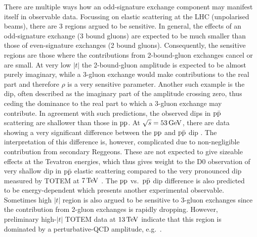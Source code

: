 There are multiple ways how an odd-signature exchange component may manifest itself in observable data. Focussing on elastic scattering at the LHC (unpolarised beams), there are 3 regions argued to be sensitive. In general, the effects of an odd-signature exchange (3 bound gluons) are expected to be much smaller than those of even-signature exchanges (2 bound gluons). Consequently, the sensitive regions are those where the contributions from 2-bound-gluon exchanges cancel or are small. At very low $|t|$ the 2-bound-gluon amplitude is expected to be almost purely imaginary, while a 3-gluon exchange would make contributions to the real part and therefore $\rho$ is a very sensitive parameter. Another such example is the dip, often described as the imaginary part of the amplitude crossing zero, thus ceding the dominance to the real part to which a 3-gluon exchange may contribute. In agreement with such predictions, the observed dips in $\rm p\bar p$ scattering are shallower than those in $\rm pp$. At $\sqrt s = 53\,{\rm GeV}$, there are data showing a very significant difference between the $\rm pp$ and $\rm p\bar p$ dip \cite{breakstone-85}. The interpretation of this difference is, however, complicated due to non-negligible contribution from secondary Reggeons. These are not expected to give sizeable effects at the Tevatron energies, which thus gives weight to the D0 observation of very shallow dip in $\rm p\bar p$ elastic scattering \cite{d0-elastic} compared to the very pronounced dip measured by TOTEM at $7\,{\rm TeV}$ \cite{totem-7tev-first}. The $\rm pp$ vs.~$\rm p\bar p$ dip difference is also predicted to be energy-dependent which presents another experimental observable. Sometimes high $|t|$ region is also argued to be sensitive to 3-gluon exchanges since the contribution from 2-gluon exchanges is rapidly dropping. However, preliminary high-$|t|$ TOTEM data at $13\,{\rm TeV}$ indicate that this region is dominated by a perturbative-QCD amplitude, e.g.~\cite{Donnachie:1979yu}.


